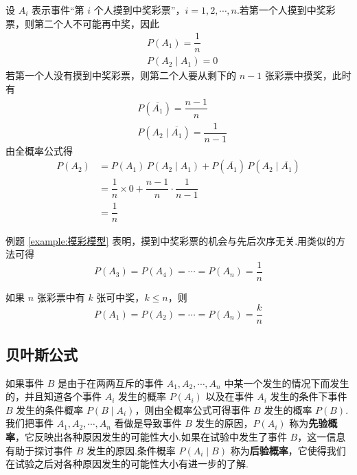 \begin{solution}
    设 $A_i$ 表示事件“第 $i$ 个人摸到中奖彩票”，$i=1,2,\cdots,n$.若第一个人摸到中奖彩票，则第二个人不可能再中奖，因此
    $$
    \begin{aligned}
        & P(A_1) = \dfrac{1}{n} \\
        & P(A_2 \mid A_1) = 0
    \end{aligned}
    $$
    若第一个人没有摸到中奖彩票，则第二个人要从剩下的 $n-1$ 张彩票中摸奖，此时有
    $$
    \begin{aligned}
        & P(\overline{A_1}) = \dfrac{n-1}{n} \\
        & P(A_2 \mid \overline{A_1}) = \dfrac{1}{n-1}
    \end{aligned}
    $$
    由全概率公式得
    $$
    \begin{aligned}
        P(A_2) &= P(A_1) \, P(A_2 \mid A_1) + P(\overline{A_1}) \, P(A_2 \mid \overline{A_1}) \\
        &= \dfrac{1}{n} \times 0 + \dfrac{n-1}{n} \cdot \dfrac{1}{n-1} \\
        &= \dfrac{1}{n}
    \end{aligned}
    $$
\end{solution}

\begin{note}
    \indent 例题 \ref{example:摸彩模型} 表明，摸到中奖彩票的机会与先后次序无关.用类似的方法可得
    $$
    P(A_3) = P(A_4) = \cdots = P(A_n) = \dfrac{1}{n}
    $$
    
    如果 $n$ 张彩票中有 $k$ 张可中奖，$k \leqslant n$，则
    $$
    P(A_1) = P(A_2) = \cdots = P(A_n) = \dfrac{k}{n}
    $$
\end{note}

\subsection{贝叶斯公式}

如果事件 $B$ 是由于在两两互斥的事件 $A_1,A_2,\cdots,A_n$ 中某一个发生的情况下而发生的，并且知道各个事件 $A_i$ 发生的概率 $P(A_i)$ 以及在事件 $A_i$ 发生的条件下事件 $B$ 发生的条件概率 $P(B \mid A_i)$，则由全概率公式可得事件 $B$ 发生的概率 $P(B)$.我们把事件 $A_1,A_2,\cdots,A_n$ 看做是导致事件 $B$ 发生的原因，$P(A_i)$ 称为\textbf{先验概率}，它反映出各种原因发生的可能性大小.如果在试验中发生了事件 $B$，这一信息有助于探讨事件 $B$ 发生的原因.条件概率 $P(A_i \mid B)$ 称为\textbf{后验概率}，它使得我们在试验之后对各种原因发生的可能性大小有进一步的了解.

